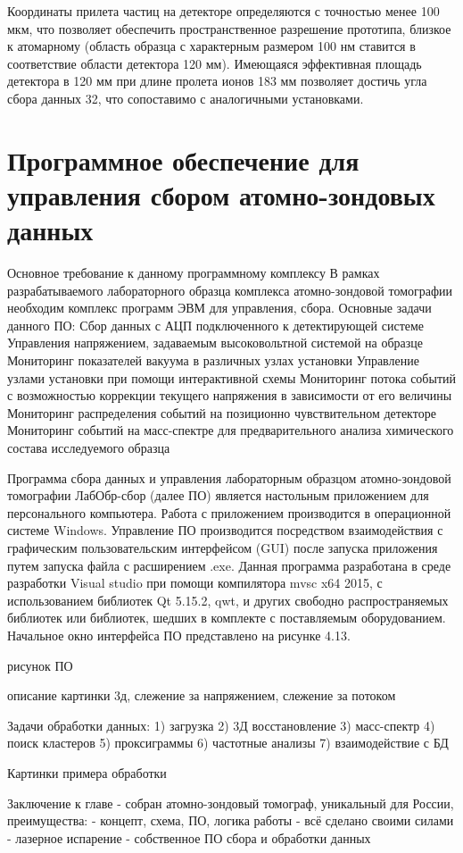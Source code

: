 Координаты прилета частиц на детекторе определяются с точностью менее 100 мкм, что позволяет обеспечить пространственное разрешение прототипа, близкое к атомарному (область образца с характерным размером 100 нм ставится в соответствие области детектора 120 мм). Имеющаяся эффективная площадь детектора в 120 мм при длине пролета ионов 183 мм позволяет достичь угла сбора данных 32, что сопоставимо с аналогичными установками.

\FloatBarrier

\section{Программное обеспечение для управления сбором атомно-зондовых данных}\label{sec:ch2/sec5}

Основное требование к данному программному комплексу 
В рамках разрабатываемого лабораторного образца комплекса атомно-зондовой томографии необходим комплекс программ ЭВМ для управления, сбора.
Основные задачи данного ПО:
Сбор данных с АЦП подключенного к детектирующей системе
Управления напряжением, задаваемым высоковольтной системой на образце
Мониторинг показателей вакуума в различных узлах установки
Управление узлами установки при помощи интерактивной схемы
Мониторинг потока событий с возможностью коррекции текущего напряжения в зависимости от его величины
Мониторинг распределения событий на позиционно чувствительном детекторе
Мониторинг событий на масс-спектре для предварительного анализа химического состава исследуемого образца

Программа сбора данных и управления лабораторным образцом атомно-зондовой томографии ЛабОбр-сбор (далее ПО) является настольным приложением для персонального компьютера. Работа с приложением производится в операционной системе Windows. Управление ПО производится посредством взаимодействия с графическим пользовательским интерфейсом (GUI) после запуска приложения путем запуска файла с расширением .exe. Данная программа разработана в среде разработки Visual studio при помощи компилятора mvsc x64 2015, с использованием библиотек Qt 5.15.2, qwt, и других свободно распространяемых библиотек или библиотек, шедших в комплекте с поставляемым оборудованием. Начальное окно интерфейса ПО представлено на рисунке 4.13.

рисунок ПО

описание картинки 3д, слежение за напряжением, слежение за потоком


Задачи обработки данных:
1) загрузка
2) 3Д восстановление
3) масс-спектр
4) поиск кластеров
5) проксиграммы
6) частотные анализы
7) взаимодействие с БД

Картинки примера обработки


\FloatBarrier

Заключение к главе - собран атомно-зондовый томограф, уникальный для России, преимущества:
- концепт, схема, ПО, логика работы - всё сделано своими силами
- лазерное испарение
- собственное ПО сбора и обработки данных










